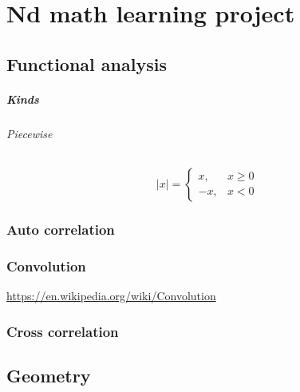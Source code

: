 \documentclass{book}
\begin{document}
\chapter{Nd math learning project}

\section{Functional analysis}


% 


\paragraph{Kinds}
        \subparagraph{Piecewise}
            \[
                |x| =
                \begin{cases}
                    x, & x \ge 0 \\
                    -x, & x < 0
                \end{cases}
            \]

\subsection{Auto correlation}


% 

\subsection{Convolution}


\url{https://en.wikipedia.org/wiki/Convolution}

\subsection{Cross correlation}


% 

\section{Geometry}
\end{document}
